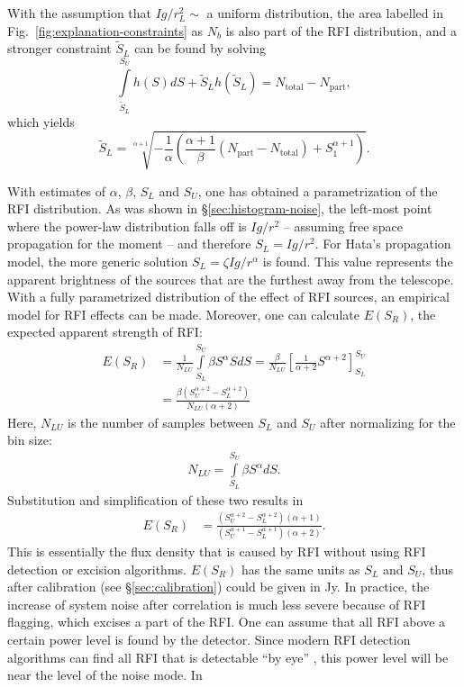 \documentclass[useAMS,usenatbib]{mn2e}
\begin{document}
With the assumption that $Ig/r_L^2\sim$ a uniform distribution, the area labelled in Fig.~\ref{fig:explanation-constraints} as $N_b$ is also part of the RFI distribution, and a stronger constraint $\tilde S_L$ can be found by solving
\begin{equation}
 \int\limits_{\tilde S_L}^{S_U} h(S) dS + \tilde S_{L} h(\tilde S_{L}) = N_\textrm{total} - N_\textrm{part},
\end{equation}
which yields
\begin{equation} \label{eq:lower-limit-2}
\tilde S_L = \sqrt[\alpha+1]{ - \frac{1}{\alpha} \left( \frac{\alpha+1}{\beta} \left(N_\textrm{part} - N_\textrm{total}\right) + S_1^{\alpha+1} \right) }.
\end{equation}

With estimates of $\alpha$, $\beta$, $S_L$ and $S_U$, one has obtained a parametrization of the RFI distribution. As was shown in \S\ref{sec:histogram-noise}, the left-most point where the power-law distribution falls off is $Ig/r^2$ -- assuming free space propagation for the moment -- and therefore $S_L = Ig/r^2$. For Hata's propagation model, the more generic solution $S_L = \zeta Ig / r^\alpha$ is found. This value represents the apparent brightness of the sources that are the furthest away from the telescope. With a fully parametrized distribution of the effect of RFI sources, an empirical model for RFI effects can be made. Moreover, one can calculate $E(S_R)$, the expected apparent strength of RFI:
\begin{align} \label{eq:expected-value-rfi-def}
E(S_R) & = \frac{1}{N_{LU}}\int\limits_{S_L}^{S_U} \beta S^\alpha S dS
 = \frac{\beta}{N_{LU}} \left[ \frac{1}{\alpha+2} S^{\alpha+2} \right]_{S_L}^{S_U} \\
 & = \frac{\beta \left( S_U^{\alpha+2} - S_L^{\alpha+2} \right) }{N_{LU} \left( \alpha+2\right) }
\end{align}
Here, $N_{LU}$ is the number of samples between $S_L$ and $S_U$ after normalizing for the bin size:
\begin{align} \label{eq:n-between-sl-su}
N_{LU} = \int\limits_{S_L}^{S_U} \beta S^\alpha dS.
\end{align}
Substitution and simplification of these two results in
\begin{align} \label{eq:expected-value-rfi}
 E(S_R) & = \frac
{\left( S_U^{\alpha+2} - S_L^{\alpha+2}\right)\left(\alpha+1\right)} 
{\left(S_U^{\alpha+1} - S_L^{\alpha+1}\right) \left(\alpha+2 \right)}.
\end{align}
This is essentially the flux density that is caused by RFI without using RFI detection or excision algorithms. $E(S_R)$ has the same units as $S_L$ and $S_U$, thus after calibration (see \S\ref{sec:calibration}) could be given in Jy. In practice, the increase of system noise after correlation is much less severe because of RFI flagging, which excises a part of the RFI. One can assume that all RFI above a certain power level is found by the detector. Since modern RFI detection algorithms can find all RFI that is detectable ``by eye'' \citep{post-correlation-rfi-classification}, this power level will be near the level of the noise mode. In
\end{document}
